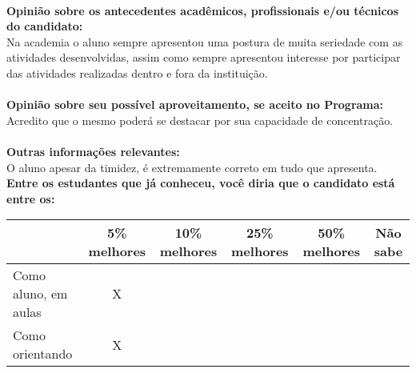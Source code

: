 \documentclass[11pt]{article}
\begin{document}
\\
\textbf{Opinião sobre os antecedentes acadêmicos, profissionais e/ou técnicos do candidato:}
\\Na academia o aluno sempre apresentou uma postura de muita seriedade com as atividades desenvolvidas, assim como sempre apresentou interesse por participar das atividades realizadas dentro e fora da instituição. \\
\\
\textbf{Opinião sobre seu possível aproveitamento, se aceito no Programa:}
\\Acredito que o mesmo poderá se destacar por sua capacidade de concentração.\\ 
\\
\textbf{Outras informações relevantes:} \\ O aluno apesar da timidez, é extremamente correto em tudo que apresenta.
\\[0.3cm]
\textbf{Entre os estudantes que já conheceu, você diria que o candidato está entre os:}
\\
\begin{tabular}{|l|c|c|c|c|c|}
\hline
 & 5\% melhores & 10\% melhores & 25\% melhores & 50\% melhores & Não sabe \\
\hline
Como aluno, em aulas & X &  &  &  & \\
\hline
Como orientando & X &  &  &  & \\
\hline
\end{tabular}
\end{document}
